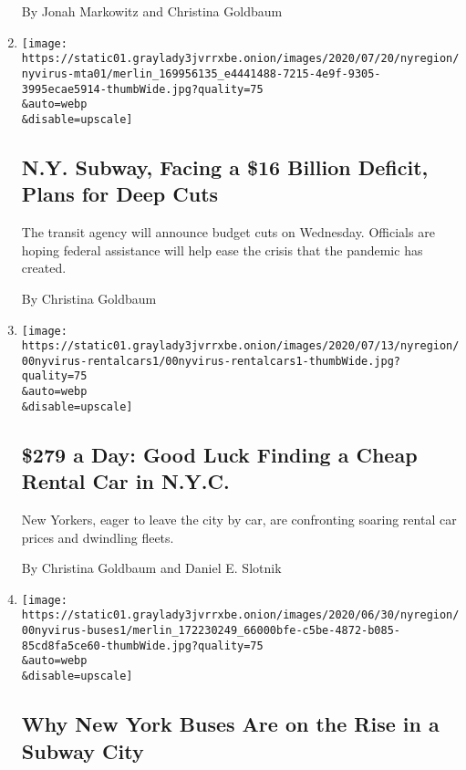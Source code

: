 \begin{enumerate}
  By Jonah Markowitz and Christina Goldbaum
\item
  \href{/2020/07/21/nyregion/mta-subway-financial-cuts.html}{}

  \texttt{[image: https://static01.graylady3jvrrxbe.onion/images/2020/07/20/nyregion/nyvirus-mta01/merlin\_169956135\_e4441488-7215-4e9f-9305-3995ecae5914-thumbWide.jpg?quality=75\\\&auto=webp\\\&disable=upscale]}

  \hypertarget{ny-subway-facing-a-16-billion-deficit-plans-for-deep-cuts}{%
  \subsection{N.Y. Subway, Facing a \$16 Billion Deficit, Plans for Deep
  Cuts}\label{ny-subway-facing-a-16-billion-deficit-plans-for-deep-cuts}}

  The transit agency will announce budget cuts on Wednesday. Officials
  are hoping federal assistance will help ease the crisis that the
  pandemic has created.

  By Christina Goldbaum
\item
  \href{/2020/07/17/nyregion/car-rental-nyc-shortage-coronavirus.html}{}

  \texttt{[image: https://static01.graylady3jvrrxbe.onion/images/2020/07/13/nyregion/00nyvirus-rentalcars1/00nyvirus-rentalcars1-thumbWide.jpg?quality=75\\\&auto=webp\\\&disable=upscale]}

  \hypertarget{279-a-day-good-luck-finding-a-cheap-rental-car-in-nyc}{%
  \subsection{\$279 a Day: Good Luck Finding a Cheap Rental Car in
  N.Y.C.}\label{279-a-day-good-luck-finding-a-cheap-rental-car-in-nyc}}

  New Yorkers, eager to leave the city by car, are confronting soaring
  rental car prices and dwindling fleets.

  By Christina Goldbaum and Daniel E. Slotnik
\item
  \href{/2020/07/06/nyregion/mta-buses-nyc-coronavirus.html}{}

  \texttt{[image: https://static01.graylady3jvrrxbe.onion/images/2020/06/30/nyregion/00nyvirus-buses1/merlin\_172230249\_66000bfe-c5be-4872-b085-85cd8fa5ce60-thumbWide.jpg?quality=75\\\&auto=webp\\\&disable=upscale]}

  \hypertarget{why-new-york-buses-are-on-the-rise-in-a-subway-city}{%
  \subsection{Why New York Buses Are on the Rise in a Subway
  City}\label{why-new-york-buses-are-on-the-rise-in-a-subway-city}}


\end{enumerate}
